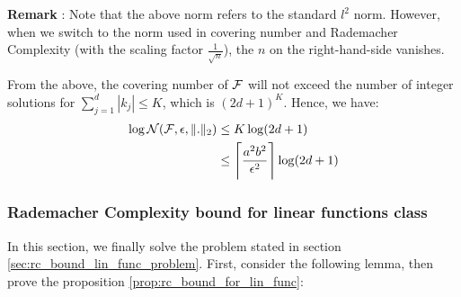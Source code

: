 \begin{proof*}
    \noindent \textbf{Remark} : Note that the above norm refers to the standard $l^2$ norm. However, when we switch to the norm used in covering number and Rademacher Complexity (with the scaling factor $\frac{1}{\sqrt n}$), the $n$ on the right-hand-side vanishes.

    \noindent\newline From the above, the covering number of $\mathcal{F}$ will not exceed the number of integer solutions for $\sum_{j=1}^{d}|k_j| \le K$, which is $(2d+1)^K$. Hence, we have:
    \begin{align*}
        \log\mathcal{N}(\mathcal{F}, \epsilon, \|.\|_2) &\le K\log(2d+1) \\
        &\le \Bigg\lceil \frac{a^2b^2}{\epsilon^2} \Bigg\rceil \log(2d+1)
    \end{align*}
\end{proof*}


\subsubsection{Rademacher Complexity bound for linear functions class}
In this section, we finally solve the problem stated in section \ref{sec:rc_bound_lin_func_problem}. First, consider the following lemma, then prove the proposition \ref{prop:rc_bound_for_lin_func}:

